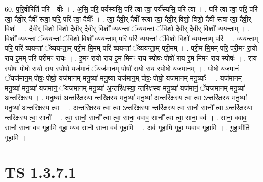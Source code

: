\documentclass[17pt]{extarticle}
\begin{document}
60. प॒रि॒वीरिति॑ परि - वीः । . अ॒सि॒ परि॒ पर्य॑स्यसि॒ परि॑ त्वा त्वा॒ पर्य॑स्यसि॒ परि॑ त्वा । . परि॑ त्वा त्वा॒ परि॒ परि॑ त्वा॒ दैवी॒र् दैवी᳚ स्त्वा॒ परि॒ परि॑ त्वा॒ दैवीः᳚ । . त्वा॒ दैवी॒र् दैवी᳚ स्त्वा त्वा॒ दैवी॒र् विशो॒ विशो॒ दैवी᳚ स्त्वा त्वा॒ दैवी॒र् विशः॑ । . दैवी॒र् विशो॒ विशो॒ दैवी॒र् दैवी॒र् विशो᳚ व्ययन्तां ॅव्ययन्तां॒ ॅविशो॒ दैवी॒र् दैवी॒र् विशो᳚ व्ययन्ताम् । . विशो᳚ व्ययन्तां ॅव्ययन्तां॒ ॅविशो॒ विशो᳚ व्ययन्ता॒म् परि॒ परि॑ व्ययन्तां॒ ॅविशो॒ विशो᳚ व्ययन्ता॒म् परि॑ । . व्य॒य॒न्ता॒म् परि॒ परि॑ व्ययन्तां ॅव्ययन्ता॒म् परी॒म मि॒मम् परि॑ व्ययन्तां ॅव्ययन्ता॒म् परी॒मम् । . परी॒म मि॒मम् परि॒ परी॒मꣳ रा॒यो रा॒य इ॒मम् परि॒ परी॒मꣳ रा॒यः । . इ॒मꣳ रा॒यो रा॒य इ॒म मि॒मꣳ रा॒य स्पोषः॒ पोषो॑ रा॒य इ॒म मि॒मꣳ रा॒य स्पोषः॑ । . रा॒य स्पोषः॒ पोषो॑ रा॒यो रा॒य स्पोषो॒ यज॑मानं॒ ॅयज॑मान॒म् पोषो॑ रा॒यो रा॒य स्पोषो॒ यज॑मानम् । . पोषो॒ यज॑मानं॒ ॅयज॑मान॒म् पोषः॒ पोषो॒ यज॑मानम् मनु॒ष्या॑ मनु॒ष्या॑ यज॑मान॒म् पोषः॒ पोषो॒ यज॑मानम् मनु॒ष्याः᳚ । . यज॑मानम् मनु॒ष्या॑ मनु॒ष्या॑ यज॑मानं॒ ॅयज॑मानम् मनु॒ष्या॑ अ॒न्तरि॑क्षस्या॒ न्तरि॑क्षस्य मनु॒ष्या॑ यज॑मानं॒ ॅयज॑मानम् मनु॒ष्या॑ अ॒न्तरि॑क्षस्य । . म॒नु॒ष्या॑ अ॒न्तरि॑क्षस्या॒ न्तरि॑क्षस्य मनु॒ष्या॑ मनु॒ष्या॑ अ॒न्तरि॑क्षस्य त्वा त्वा॒ ऽन्तरि॑क्षस्य मनु॒ष्या॑ मनु॒ष्या॑ अ॒न्तरि॑क्षस्य त्वा । . अ॒न्तरि॑क्षस्य त्वा त्वा॒ ऽन्तरि॑क्षस्या॒ न्तरि॑क्षस्य त्वा॒ सानौ॒ सानौ᳚ त्वा॒ ऽन्तरि॑क्षस्या॒ न्तरि॑क्षस्य त्वा॒ सानौ᳚ । . त्वा॒ सानौ॒ सानौ᳚ त्वा त्वा॒ साना॒ ववाव॒ सानौ᳚ त्वा त्वा॒ साना॒ वव॑ । . साना॒ ववाव॒ सानौ॒ साना॒ वव॑ गूहामि गूहा॒ म्यव॒ सानौ॒ साना॒ वव॑ गूहामि । . अव॑ गूहामि गूहा॒ म्यवाव॑ गूहामि । . गू॒हा॒मीति॑ गूहामि । \newline
\pagebreak
{}

\section{ TS 1.3.7.1 }
\end{document}
